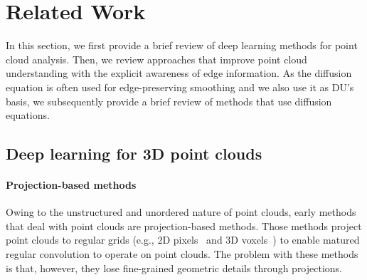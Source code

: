\documentclass[a4paper,fleqn]{cas-dc}
\begin{document}
\section{Related Work}
\label{sec:related_work}
In this section, we first provide a brief review of deep learning methods for point cloud analysis. Then, we review approaches that improve point cloud understanding with the explicit awareness of edge information. As the diffusion equation is often used for edge-preserving smoothing and we also use it as DU's basis, we subsequently provide a brief review of methods that use diffusion equations.   

\subsection{Deep learning for 3D point clouds}
\paragraph{Projection-based methods} 
Owing to the unstructured and unordered nature of point clouds, early methods that deal with point clouds are projection-based methods. Those methods project point clouds to regular grids (e.g., 2D pixels~\cite{kanezaki2018rotationnet,su2015multi,feng2018gvcnn} and 3D voxels~\cite{maturana2015voxnet,wang2017cnn,tatarchenko2017octree,zhou2018voxelnet,graham20183d,choy20194d}) to enable matured regular convolution to operate on point clouds. The problem with these methods is that, however, they lose fine-grained geometric details through projections. 
\end{document}
